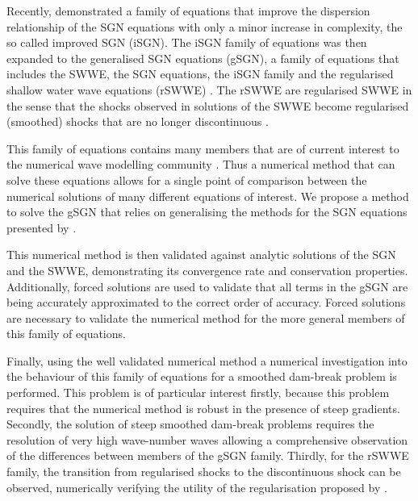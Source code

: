 \documentclass[10pt]{elsarticle}
\begin{document}
Recently, \citet{Clamond-et.al-2017-245} demonstrated a family of equations that improve the dispersion relationship of the SGN equations with only a minor increase in complexity, the so called improved SGN (iSGN). The iSGN family of equations was then expanded to the generalised SGN equations (gSGN), a family of equations that includes the SWWE, the SGN equations, the iSGN family and the regularised shallow water wave equations (rSWWE) \cite{Clamond-Dutykh-2018-237}. The rSWWE are regularised SWWE in the sense that the shocks observed in solutions of the SWWE become regularised (smoothed) shocks that are no longer discontinuous \cite{Pu-2018-1361}.

This family of equations contains many members that are of current interest to the numerical wave modelling community \cite{Clamond-et.al-2017-245,Clamond-Dutykh-2018-237}. Thus a numerical method that can solve these equations allows for a single point of comparison between the numerical solutions of many different equations of interest. We propose a method to solve the gSGN that relies on generalising the methods for the SGN equations presented by \citet{Zoppou-etal-2017}.

This numerical method is then validated against analytic solutions of the SGN and the SWWE, demonstrating its convergence rate and conservation properties. Additionally, forced solutions are used to validate that all terms in the gSGN are being accurately approximated to the correct order of accuracy. Forced solutions are necessary to validate the numerical method for the more general members of this family of equations.

Finally, using the well validated numerical method a numerical investigation into the behaviour of this family of equations for a smoothed dam-break problem is performed. This problem is of particular interest firstly, because this problem requires that the numerical method is robust in the presence of steep gradients. Secondly, the solution of steep smoothed dam-break problems requires the resolution of very high wave-number waves allowing  a comprehensive observation of the differences between members of the gSGN family. Thirdly, for the rSWWE family, the transition from regularised shocks to the discontinuous shock can be observed, numerically verifying the utility of the regularisation proposed by \citet{Clamond-Dutykh-2018-237}. 
\end{document}
